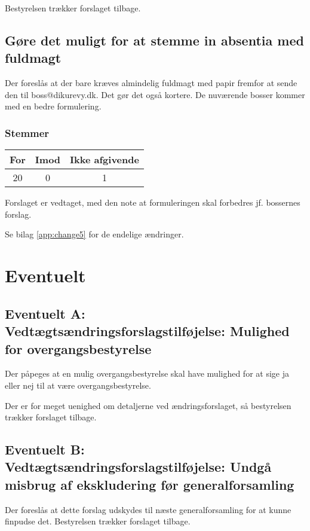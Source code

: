 \documentclass[a4paper,11pt]{report}
\begin{document}
Bestyrelsen trækker forslaget tilbage.

\subsection*{Gøre det muligt for at stemme in absentia med fuldmagt}

Der foreslås at der bare kræves almindelig fuldmagt med papir fremfor at sende
den til boss@dikurevy.dk.  Det gør det også kortere.  De nuværende bosser kommer
med en bedre formulering.

\subsubsection*{Stemmer}
\begin{tabular}{ c | c | c }
For & Imod & Ikke afgivende \\
\hline
20 & 0 & 1 \\
\end{tabular}

Forslaget er vedtaget, med den note at formuleringen skal forbedres
jf. bossernes forslag.

Se bilag \ref{app:change5} for de endelige ændringer.

\section*{Eventuelt}

\subsection*{Eventuelt A: Vedtægtsændringsforslagstilføjelse: Mulighed for overgangsbestyrelse}

Der påpeges at en mulig overgangsbestyrelse skal have mulighed for at sige ja
eller nej til at være overgangsbestyrelse.

Der er for meget uenighed om detaljerne ved ændringsforslaget, så bestyrelsen
trækker forslaget tilbage.

\subsection*{Eventuelt B: Vedtægtsændringsforslagstilføjelse: Undgå misbrug af ekskludering før generalforsamling}

Der foreslås at dette forslag udskydes til næste generalforsamling for at kunne
finpudse det.  Bestyrelsen trækker forslaget tilbage.
\end{document}
